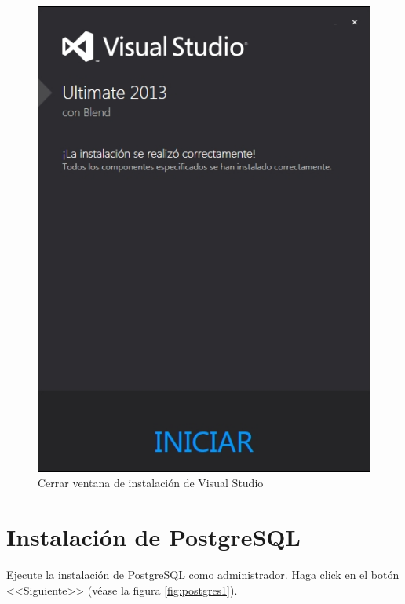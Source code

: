 \begin{figure}[H]
  \centering
  \includegraphics[width=.8\linewidth]{./img/vs-instalacion4.jpg}
\caption[]{Cerrar ventana de instalaci\'{o}n de Visual Studio\label{fig:vs-instalacion4}}
\end{figure}

\vfill

\newpage

\section*{Instalaci\'{o}n de PostgreSQL}
	
Ejecute la instalaci\'{o}n de PostgreSQL como administrador. Haga click en el bot\'{o}n <<Siguiente>> (v\'{e}ase la figura \ref{fig:postgres1}).

